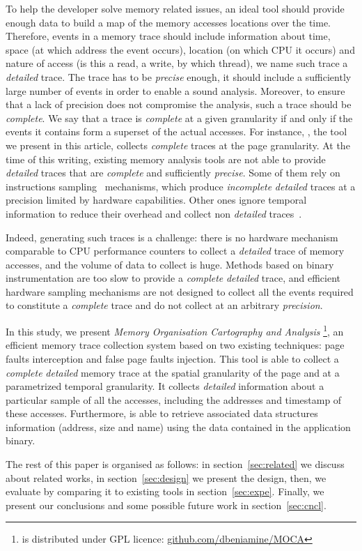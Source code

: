 To help the developer solve memory related issues, an ideal tool should provide enough data to build a map of the memory accesses locations over the time.
Therefore, events in a memory trace should include information about time, space (at which address the event occurs),
location (on which CPU it occurs) and nature of access (is this
a read, a write, by which thread), we name such trace a \emph{detailed} trace.
The trace has to be \emph{precise} enough, it should include a sufficiently large number of events in order to enable a sound analysis.
Moreover, to ensure that a lack of precision
does not compromise the analysis, such a trace should be \emph{complete}. We say that a trace is
\emph{complete} at a given granularity if and only if the events it contains
form a superset of the actual accesses.
For instance, \Moca, the tool we present in this article, collects \emph{complete} traces at the page granularity.
At the time of this writing, existing memory analysis tools are not able to provide \emph{detailed} traces that are \emph{complete} and sufficiently \emph{precise}.
Some of them rely on instructions sampling~\cite{Liu14Tool,Lachaize12MemProf}
mechanisms, which produce \emph{incomplete} \emph{detailed} traces at a precision limited by hardware capabilities. Other ones ignore temporal information to reduce their
overhead and collect non \emph{detailed} traces~\cite{Beniamine15TABARNACRR}.

Indeed, generating such traces is a challenge: there is no hardware mechanism
comparable to CPU performance counters to collect a \emph{detailed} trace of memory accesses, and the volume
of data to collect is huge. Methods based on binary instrumentation are too slow
to provide a \emph{complete} \emph{detailed} trace, and efficient hardware sampling mechanisms are not designed
to collect all the events required to constitute a \emph{complete} trace and do not collect at an arbitrary \emph{precision}.

In this study, we present \emph{Memory Organisation Cartography and Analysis}%
\footnote{\Moca is distributed under GPL licence:
    \href{https://github.com/dbeniamine/MOCA}{github.com/dbeniamine/MOCA}},
an efficient memory trace collection system based on two existing techniques:
page faults interception and false page faults injection.
This tool is able to collect a \emph{complete} \emph{detailed} memory trace at
the spatial granularity of the page and at a parametrized temporal granularity.
It collects \emph{detailed} information about a particular sample of all the accesses, including the addresses and
timestamp of these accesses. Furthermore, \Moca is able to retrieve associated data structures
information (address, size and name) using the data contained in the application binary.

The rest of this paper is organised as follows: in section~\ref{sec:related}
we discuss about related works, in section~\ref{sec:design} we present the \Moca design, then,
we evaluate \Moca by comparing it to existing tools in section~\ref{sec:expe}.
Finally, we present our conclusions and some possible future work in
section~\ref{sec:cncl}.
